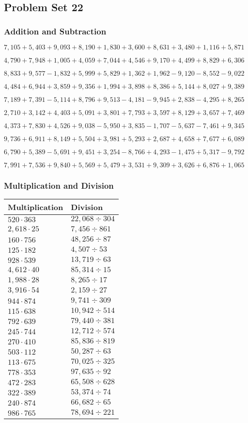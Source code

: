 \hypertarget{problem-set-22-3}{%
\subsection{Problem Set 22}\label{problem-set-22-3}}

\hypertarget{addition-and-subtraction-184}{%
\subsubsection{Addition and
Subtraction}\label{addition-and-subtraction-184}}

\(7,105+5,403+9,093+8,190+1,830+3,600+8,631+3,480+1,116+ 5,871\)

\(4,790+7,948+1,005+4,059+7,044+4,546+9,170+4,499+8,829+6,306\)

\(8,833+9,577-1,832+5,999+5,829+1,362+1,962-9,120-8,552-9,022\)

\(4,484+6,944+3,859+9,356+1,994+3,898+8,386+5,144+8,027+9,389\)

\(7,189+7,391-5,114+8,796+9,513-4,181-9,945+2,838-4,295+8,265\)

\(2,710+3,142+4,403+5,091+3,801+7,793+3,597+8,129+3,657+7,469\)

\(4,373+7,830+4,526+9,038-5,950+3,835-1,707-5,637-7,461+9,345\)

\(9,736+6,911+8,149+5,504+3,981+5,293+2,687+4,658+7,677+6,089\)

\(6,790+5,389-5,691+9,451+3,254-8,766+4,293-1,475+5,317-9,792\)

\(7,991+7,536+9,840+5,569+5,479+3,531+9,309+3,626+6,876+1,065\)

\hypertarget{multiplication-and-division-183}{%
\subsubsection{Multiplication and
Division}\label{multiplication-and-division-183}}

\begin{longtable}[]{@{}ll@{}}
\toprule
Multiplication & Division\tabularnewline
\midrule
\endhead
\(520\cdot363\) & \(22,068÷304\)\tabularnewline
\(2,618\cdot25\) & \(7,456÷861\)\tabularnewline
\(160\cdot756\) & \(48,256÷87\)\tabularnewline
\(125\cdot182\) & \(4,507÷53\)\tabularnewline
\(928\cdot539\) & \(13,719÷63\)\tabularnewline
\(4,612\cdot40\) & \(85,314÷15\)\tabularnewline
\(1,988\cdot28\) & \(8,265÷17\)\tabularnewline
\(3,916\cdot54\) & \(2,159÷27\)\tabularnewline
\(944\cdot874\) & \(9,741÷309\)\tabularnewline
\(115\cdot638\) & \(10,942÷514\)\tabularnewline
\(792\cdot639\) & \(79,440÷381\)\tabularnewline
\(245\cdot744\) & \(12,712÷574\)\tabularnewline
\(270\cdot410\) & \(85,836÷819\)\tabularnewline
\(503\cdot112\) & \(50,287÷63\)\tabularnewline
\(113\cdot675\) & \(70,025÷325\)\tabularnewline
\(778\cdot353\) & \(97,635÷92\)\tabularnewline
\(472\cdot283\) & \(65,508÷628\)\tabularnewline
\(322\cdot389\) & \(53,374÷74\)\tabularnewline
\(240\cdot874\) & \(66,682÷65\)\tabularnewline
\(986\cdot765\) & \(78,694÷221\)\tabularnewline
\bottomrule
\end{longtable}

